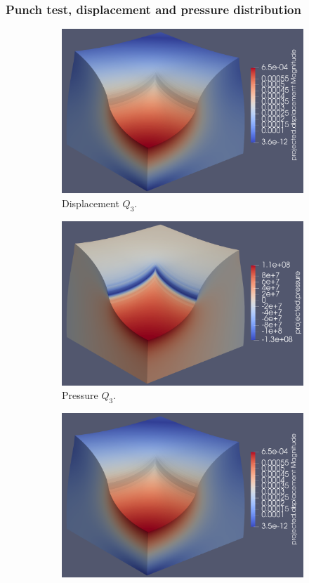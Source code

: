 \documentclass{beamer}
\begin{document}
\begin{frame}
	\frametitle{Punch test, displacement and pressure distribution}
	\begin{figure}[H]
		\begin{subfigure}{.5\textwidth}
			\centering
			\includegraphics[width=.68\textwidth]{../figs/u-Q3-320MPa-0.3.png}
			\caption{Displacement $Q_3$.}
		\end{subfigure}%
		\begin{subfigure}{.5\textwidth}
			\centering
			\includegraphics[width=.68\textwidth]{../figs/p-Q3-320MPa-0.3.png}
			\caption{Pressure $Q_3$.}
		\end{subfigure}
		\begin{subfigure}{.5\textwidth}
			\centering
			\includegraphics[width=.68\textwidth]{../figs/u-Q3Q2-320MPa-0.3.png}

\end{subfigure}
\end{figure}
\end{frame}
\end{document}
